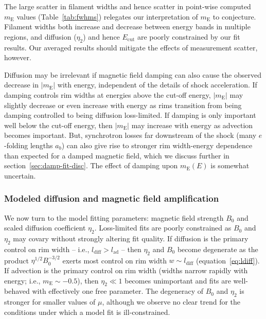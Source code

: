 \documentclass[manuscript]{aastex}  %
\newcommand*{\mt}{\mathrm}
\newcommand*{\mE}{m_\mt{E}}
\newcommand*{\Ecut}{E_{\mt{cut}}}
\begin{document}
The large scatter in filament widths and hence scatter in point-wise computed
$\mE$ values (Table~\ref{tab:fwhms}) relegates our interpretation of $\mE$ to
conjecture.  Filament widths both increase and decrease between energy bands in
multiple regions, and diffusion ($\eta_2$) and hence $\Ecut$ are poorly
constrained by our fit results.  Our averaged results should mitigate the
effects of measurement scatter, however.

Diffusion may be irrelevant if magnetic field damping can also cause the
observed decrease in $|\mE|$ with energy, independent of the details of shock
acceleration.  If damping controls rim widths at energies above the cut-off
energy, $|\mE|$ may slightly decrease or even increase with energy as rims
transition from being damping controlled to being diffusion loss-limited.  If
damping is only important well below the cut-off energy, then $|\mE|$ may
increase with energy as advection becomes important.  But, synchrotron
losses far downstream of the shock (many $e$-folding lengths $a_b$) can also
give rise to stronger rim width-energy dependence than expected for a damped
magnetic field, which we discuss further in section~\ref{sec:damp-fit-disc}.
The effect of damping upon $\mE(E)$ is somewhat uncertain.

\subsubsection{Modeled diffusion and magnetic field amplification}

We now turn to the model fitting parameters: magnetic field strength $B_0$ and
scaled diffusion coefficient $\eta_2$.  Loss-limited fits are poorly
constrained as $B_0$ and $\eta_2$ may covary without strongly altering fit
quality.  If diffusion is the primary control on rim width -- i.e.,
$l_{\mt{diff}} > l_{\mt{ad}}$ -- then $\eta_2$ and $B_0$ become degenerate as
the product $\eta^{1/2} B_0^{-3/2}$ exerts most control on rim width $w \sim
l_{\mt{diff}}$ (equation~\eqref{eq:ldiff}).  If advection is the primary
control on rim width (widths narrow rapidly with energy; i.e., $\mE \sim
-0.5$), then $\eta_2 \ll 1$ becomes unimportant and fits are well-behaved with
effectively one free parameter.  The degeneracy of $B_0$ and $\eta_2$ is
stronger for smaller values of $\mu$, although we observe no clear trend for
the conditions under which a model fit is ill-constrained.
\end{document}
